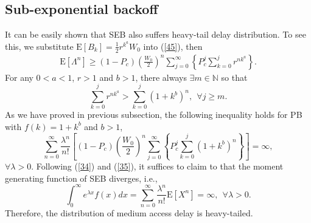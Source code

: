 \documentclass[journal]{IEEEtran}
\begin{document}
\subsection{Sub-exponential backoff}
It can be easily shown that SEB also suffers heavy-tail delay distribution. To see this, we substitute $\text{E}\left[B_k\right]=\frac{1}{2}r^{k^a}W_0$ into (\ref{45}), then
\begin{equation}
\label{34}
\begin{aligned}
\text{E}\left[\Lambda^n\right]\geq \left(1-P_c\right)\left(\frac{W_0}{2}\right)^n\sum_{j=0}^{\infty}\left\{P_c^j \sum_{k=0}^{j}r^{nk^a}\right\}.
\end{aligned}
\end{equation}
For any $0<a<1$, $r>1$ and $b>1$, there always $\exists m\in\mathbb{N}$ so that
\begin{equation}
\sum_{k=0}^{j}r^{nk^a}>\sum_{k=0}^{j}\left(1+k^b\right)^n,\ \ \forall j\geq m.
\end{equation}
As we have proved in previous subsection, the following inequality holds for PB with $f(k)=1+k^b$ and $b>1$,
\begin{equation}
\label{35}
\sum_{n=0}^{\infty}\frac{\lambda^n}{n!}\left[\left(1-P_c\right)\left(\frac{W_0}{2}\right)^n\sum_{j=0}^{\infty}\left\{P_c^j \sum_{k=0}^{j}\left(1+k^b\right)^n\right\}\right]=\infty,
\end{equation}
$\forall \lambda>0$. Following (\ref{34}) and (\ref{35}), it suffices to claim to that the moment generating function of SEB diverges, i.e.,
\begin{equation}
\int_0^{\infty} e^{\lambda x}f(x)dx=\sum_{n=0}^{\infty}\frac{\lambda^n}{n!}\text{E}\left[X^n\right]=\infty,\ \  \forall \lambda>0.
\end{equation}
Therefore, the distribution of medium access delay is heavy-tailed.
\end{document}
